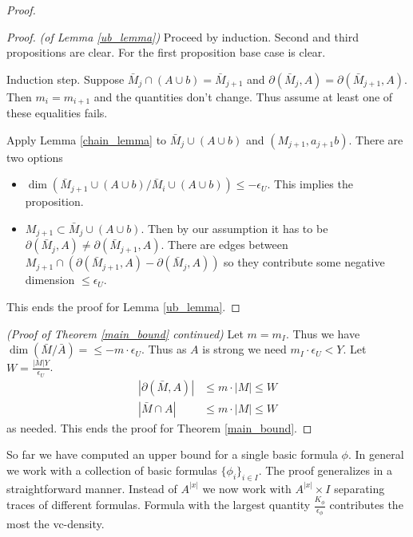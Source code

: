 \documentclass{amsart}
\begin{document}
\begin{proof}
	\begin{proof} \textit{(of Lemma \ref{ub_lemma})}
		Proceed by induction.
		Second and third propositions are clear.
		For the first proposition base case is clear.
		
		Induction step.
		Suppose $\bar M_j \cap (A \cup b) = \bar M_{j+1}$ and $\partial(\bar M_j, A) = \partial(\bar M_{j+1}, A)$.
		Then $m_i = m_{i+1}$ and the quantities don't change.
		Thus assume at least one of these equalities fails.
		
		Apply Lemma \ref{chain_lemma} to $\bar M_j \cup (A \cup b)$ and $(M_{j+1}, a_{j+1}b)$.
		There are two options
		
		\begin{itemize}
			\item $\dim(\bar M_{j+1} \cup (A \cup b) / \bar M_i \cup (A \cup b)) \leq -\epsilon_U$.
			This implies the proposition.
			\item $M_{j+1} \subset \bar M_j \cup (A \cup b)$.
			Then by our assumption it has to be $\partial(\bar M_j, A) \neq \partial(\bar M_{j+1}, A)$.
			There are edges between $M_{j+1} \cap (\partial(\bar M_{j+1}, A) - \partial(\bar M_j, A))$ so they contribute some negative dimension $\leq \epsilon_U$.
		\end{itemize}
		This ends the proof for Lemma \ref{ub_lemma}.
	\end{proof}
	\textit{(Proof of Theorem \ref{main_bound} continued)}
	Let $m = m_I$.
	Thus we have $\dim(\bar M / \bar A) = \leq -m \cdot \epsilon_U $.
	Thus as $A$ is strong we need $m_I \cdot \epsilon_U < Y$.
	Let $W = \frac{|M|Y}{\epsilon_U}$.
	\begin{align*}
		|\partial(\bar M, A)| &\leq m \cdot |M| \leq W \\
		|\bar M \cap A| &\leq m \cdot |M| \leq W
	\end{align*}
	as needed.
	This ends the proof for Theorem \ref{main_bound}.
\end{proof}

So far we have computed an upper bound for a single basic formula $\phi$.
In general we work with a collection of basic formulas $\{\phi_i\}_{i \in I}$.
The proof generalizes in a straightforward manner.
Instead of $A^{|x|}$ we now work with $A^{|x|} \times I$ separating traces of different formulas.
Formula with the largest quantity $\frac{K_\phi}{\epsilon_\phi}$ contributes the most the vc-density.





\end{document}
